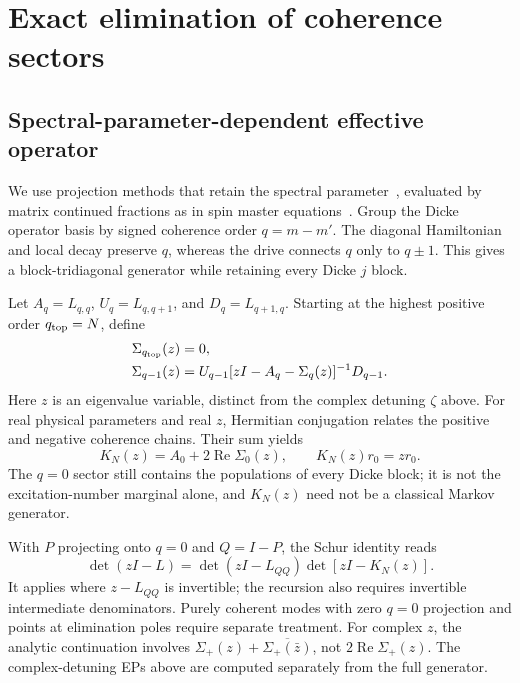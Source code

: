 \documentclass[aps,pra,twocolumn,superscriptaddress,amsmath,amssymb,reprint,floatfix]{revtex4-2}
\begin{document}
\section{Exact elimination of coherence sectors}
\label{sec:coherence}
\subsection{Spectral-parameter-dependent effective operator}
We use projection methods that retain the spectral parameter~\cite{Feshbach1958,FSElimination2020}, evaluated by matrix continued fractions as in spin master equations~\cite{GarciaPalaciosZueco2006}. Group the Dicke operator basis by signed coherence order $q=m-m'$. The diagonal Hamiltonian and local decay preserve $q$, whereas the drive connects $q$ only to $q\pm1$. This gives a block-tridiagonal generator while retaining every Dicke $j$ block.

Let $A_q=L_{q,q}$, $U_q=L_{q,q+1}$, and $D_q=L_{q+1,q}$. Starting at the highest positive order $q_{\rm top}=N$, define
\begin{align}
 \Sigma_{q_{\rm top}}(z)&=0,\nonumber\\
 \Sigma_{q-1}(z)&=U_{q-1}[zI-A_q-\Sigma_q(z)]^{-1}D_{q-1}.
 \label{eq:cf}
\end{align}
Here $z$ is an eigenvalue variable, distinct from the complex detuning $\zeta$ above. For real physical parameters and real $z$, Hermitian conjugation relates the positive and negative coherence chains. Their sum yields
\begin{equation}
 K_N(z)=A_0+2\operatorname{Re}\Sigma_0(z),\qquad
 K_N(z)r_0=zr_0.
 \label{eq:K}
\end{equation}
The $q=0$ sector still contains the populations of every Dicke block; it is not the excitation-number marginal alone, and $K_N(z)$ need not be a classical Markov generator.

With $P$ projecting onto $q=0$ and $Q=I-P$, the Schur identity reads
\begin{equation}
 \det(zI-L)=\det(zI-L_{QQ})\det[zI-K_N(z)].
 \label{eq:schur}
\end{equation}
It applies where $z-L_{QQ}$ is invertible; the recursion also requires invertible intermediate denominators. Purely coherent modes with zero $q=0$ projection and points at elimination poles require separate treatment. For complex $z$, the analytic continuation involves $\Sigma_+(z)+\overline{\Sigma_+(\bar z)}$, not $2\operatorname{Re}\Sigma_+(z)$. The complex-detuning EPs above are computed separately from the full generator.
\end{document}
